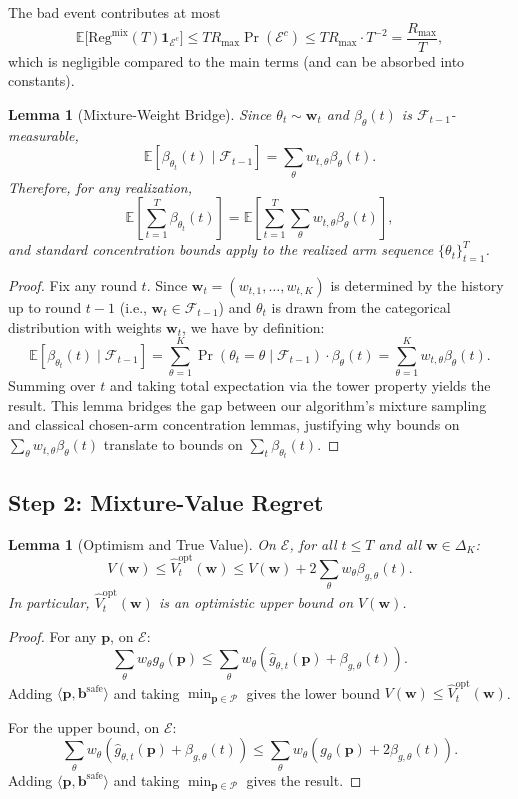 \documentclass[11pt]{article}
\newtheorem{lemma}[theorem]{Lemma}
\newcommand{\bbS}{\mathbf{b}^{\mathrm{safe}}}
\newcommand{\bp}{\mathbf{p}}
\newcommand{\bw}{\mathbf{w}}
\newcommand{\E}{\mathbb{E}}
\newcommand{\cP}{\mathcal{P}}
\newcommand{\cF}{\mathcal{F}}
\newcommand{\cE}{\mathcal{E}}
\begin{document}
The bad event contributes at most
\[
\E\big[\mathrm{Reg}^{\mathrm{mix}}(T)\mathbf{1}_{\mathcal E^c}\big]
\le TR_{\max}\Pr(\mathcal E^c)
\le TR_{\max}\cdot T^{-2}
= \frac{R_{\max}}{T},
\]
which is negligible compared to the main terms (and can be absorbed into constants).

\begin{lemma}[Mixture-Weight Bridge]
\label{lem:mixture-bridge}
Since $\theta_t \sim \bw_t$ and $\beta_\theta(t)$ is $\cF_{t-1}$-measurable,
\[
\E[\beta_{\theta_t}(t) \mid \cF_{t-1}] = \sum_\theta w_{t,\theta} \beta_\theta(t).
\]
Therefore, for any realization,
\[
\E\left[\sum_{t=1}^T \beta_{\theta_t}(t)\right] = \E\left[\sum_{t=1}^T \sum_\theta w_{t,\theta} \beta_\theta(t)\right],
\]
and standard concentration bounds apply to the realized arm sequence $\{\theta_t\}_{t=1}^T$.
\end{lemma}

\begin{proof}
Fix any round $t$. Since $\bw_t = (w_{t,1}, \ldots, w_{t,K})$ is determined by the history up to round $t-1$ (i.e., $\bw_t \in \cF_{t-1}$) and $\theta_t$ is drawn from the categorical distribution with weights $\bw_t$, we have by definition:
\[
\E[\beta_{\theta_t}(t) \mid \cF_{t-1}] = \sum_{\theta=1}^K \Pr(\theta_t = \theta \mid \cF_{t-1}) \cdot \beta_\theta(t) = \sum_{\theta=1}^K w_{t,\theta} \beta_\theta(t).
\]
Summing over $t$ and taking total expectation via the tower property yields the result. This lemma bridges the gap between our algorithm's mixture sampling and classical chosen-arm concentration lemmas, justifying why bounds on $\sum_\theta w_{t,\theta} \beta_\theta(t)$ translate to bounds on $\sum_t \beta_{\theta_t}(t)$.
\end{proof}

\subsection{Step 2: Mixture-Value Regret}

\begin{lemma}[Optimism and True Value]
\label{lem:emp-dev}
On $\cE$, for all $t \le T$ and all $\bw \in \Delta_K$:
\[
V(\bw) \le \widehat{V}_t^{\mathrm{opt}}(\bw) \le V(\bw) + 2\sum_\theta w_\theta \beta_{g,\theta}(t).
\]
In particular, $\widehat{V}_t^{\mathrm{opt}}(\bw)$ is an optimistic upper bound on $V(\bw)$.
\end{lemma}

\begin{proof}
For any $\bp$, on $\cE$:
\[
\sum_\theta w_\theta g_\theta(\bp) \le \sum_\theta w_\theta (\widehat{g}_{\theta,t}(\bp) + \beta_{g,\theta}(t)).
\]
Adding $\langle \bp, \bbS \rangle$ and taking $\min_{\bp \in \cP}$ gives the lower bound $V(\bw) \le \widehat{V}_t^{\mathrm{opt}}(\bw)$.

For the upper bound, on $\cE$:
\[
\sum_\theta w_\theta (\widehat{g}_{\theta,t}(\bp) + \beta_{g,\theta}(t)) \le \sum_\theta w_\theta (g_\theta(\bp) + 2\beta_{g,\theta}(t)).
\]
Adding $\langle \bp, \bbS \rangle$ and taking $\min_{\bp \in \cP}$ gives the result.
\end{proof}
\end{document}
